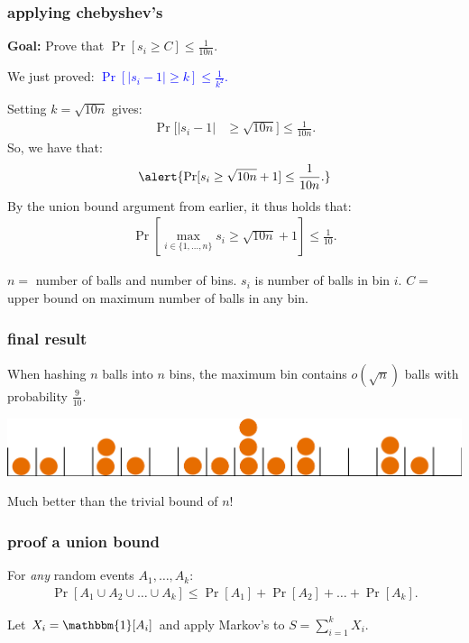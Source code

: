 \documentclass[handout,compress]{beamer}
\newcommand{\blue}[1]{\textcolor{blue}{#1}}
\begin{document}
\begin{frame}
	\frametitle{applying chebyshev's}
	\textbf{Goal:} Prove that $\Pr[s_i \geq C] \leq \frac{1}{10n}$. 
	
	We just proved: \blue{$\Pr[\left|s_i - 1\right| \geq k] \leq \frac{1}{k^2}$.}
	
	Setting $k = \sqrt{10n}$ gives: 
	\begin{align*}
		\Pr[\left|s_i - 1\right| &\geq \sqrt{10n}] \leq \frac{1}{10 n}.
	\end{align*}
	So, we have that:
	\begin{align*}
		\alert{\Pr[s_i \geq \sqrt{10n} + 1] \leq \frac{1}{10n}.}
	\end{align*}
	By the union bound argument from earlier, it thus holds that:
	\begin{align*}
		\Pr[\max_{i\in \{1,\ldots, n\}}s_i \geq \sqrt{10n} + 1] \leq \frac{1}{10}.
	\end{align*}
	
	
	\vspace{1em}
	\begin{block}{\vspace*{-3ex}}
		\small $n = $ number of balls and number of bins. $s_i$ is number of balls in bin $i$. $C =$ upper bound on maximum number of balls in any bin.
	\end{block}
\end{frame}

\begin{frame}
	\frametitle{final result}
	
	\begin{center}
		When hashing $n$ balls into $n$ bins, the maximum bin contains $o(\sqrt{n})$ balls with probability $\frac{9}{10}$.
		
		\vspace{1em}
		\includegraphics[width=.8\textwidth]{balls_into_bins.png}
		\vspace{1em}
		
		Much better than the trivial bound of $n$! 
	\end{center}
\end{frame}

\begin{frame}[t]
	\frametitle{proof a union bound}
	\begin{lemma}
		For \emph{any} random events $A_1, \ldots, A_k$:
		\begin{align*}
			\Pr[A_1 \cup A_2 \cup \ldots \cup A_k] \leq \Pr[A_1] + \Pr[A_2] + \ldots +\Pr[A_k].
		\end{align*}
	\end{lemma}

		Let $X_i =  \mathbbm{1}[A_i]$ and apply Markov's to $S = \sum_{i=1}^k X_i$. 
	
\end{frame}
\end{document}
